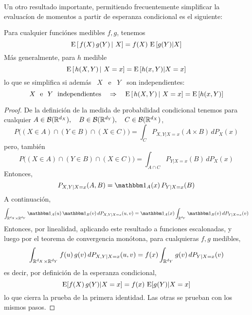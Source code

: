 Un  otro   resultado  importante,  permitiendo   frecuentemente  simplificar  la
evaluac\'ion de momentos a partir de esperanza condicional es el siguiente:
%
\begin{teorema}\label{Teo:MP:EsperanzaCondicionalFXY}
%
  Para cualquier funci\'ones medibles $f, g$, tenemos
  \[
  \operatorname{E}\left[ \left.  f(X) \, g(Y) \, \right|  \, X \right] =  f(X) \, \operatorname{E}\left[
    g(Y) | X\right]
  \]
  M\'as generalmente, para $h$ medible
  \[
  \operatorname{E}\left[ \left.  h(X,Y) \, \right|  \, X=x \right] =  \operatorname{E}\left[
    h(x,Y) | X=x\right]
  \]
  lo que se simplifica si adem\'as \ $X$ \ e \ $Y$ \ son independientes:
  \[
  \mbox{$X$  \ e  \ $Y$  \  independientes} \quad  \Rightarrow \quad  \Esp\left[
    \left.  h(X,Y) \, \right| \, X=x \right] = \Esp\left[ h(x,Y) \right]
  \]
\end{teorema}
%
\begin{proof}
  De  la definici\'on  de la  medida  de probabilidad  condicional tenemos  para
  cualquier $A  \in \mathcal{B}(\mathbb{R}^{d_X}),  \quad B \in  \mathcal{B}(\mathbb{R}^{d_Y}), \quad  C \in
  \mathcal{B}(\mathbb{R}^{d_X})$,
  \[
  P\big( (X \in  A) \cap (Y \in B)  \cap (X \in C) \big)  = \int_C P_{X,Y|X=x}(A
  \times B) \, dP_X(x)
  \]
  pero, tambi\'en
  \[
  P\big(  (X \in  A) \cap  (Y \in  B) \cap  (X \in  C) \big)  = \int_{A  \cap C}
  P_{Y|X=x}(B) \, dP_X(x)
  \]
  Entonces,
  \[
  P_{X,Y|X=x}(A,B) = \un_A(x) \, P_{Y|X=x}(B)
  \]
  A continuaci\'on,
  \[
  \int_{\Rset^{d_X}    \times    \Rset^{d_Y}}    \un_A(u)   \,    \un_B(v)    \,
  dP_{X,Y|X=x}(u,v) = \un_A(x) \int_{\Rset^{d_Y}} \un_B(v) \, dP_{Y|X=x}(v)
  \]
  Entonces, por linealidad, aplicando  este resultado a funciones escalonadas, y
  luego  por el  teorema de  convergencia  mon\'otona, para  cualquieras $f,  g$
  medibles,
  \[
  \int_{\mathbb{R}^{d_X}  \times \mathbb{R}^{d_Y}}  f(u) \, g(v)  \, dP_{X,Y|X=x}(u,v) =
  f(x) \int_{\mathbb{R}^{d_Y}} g(v) \, dP_{Y|X=x}(v)
  \]
  es decir, por definici\'on de la esperanza condicional,
  \[
  \operatorname{E}[ f(X) \, g(Y) | X = x] = f(x) \, \operatorname{E}[g(Y) | X=x]
  \]
  lo que cierra la prueba de la primera identidad.  Las otras se prueban con los
  mismos pasos.
\end{proof}

